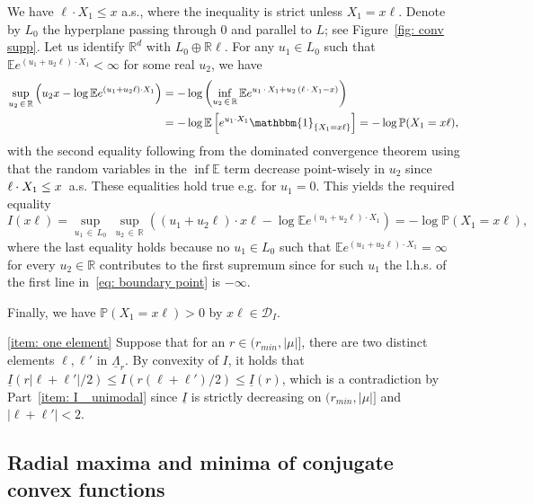 \documentclass[10pt]{amsart}
\theoremstyle{definition}\newtheorem{defi}[theo]{Definition}\newtheorem{rema}[theo]{Remark}\newtheorem{exam}[theo]{Example}\newtheorem{exem}[theo]{Example}\newtheorem{nota}[theo]{Notation}
\newcommand{\ubar}[1]{\underline{#1}}
\newcommand{\Rbb}{\mathbb{R}}
\newcommand{\E}{\mathbb{E}}
\newcommand{\Pbb}{\mathbb{P}}
\newcommand{\I}{\mathbbm{1}}
\newcommand{\Dcl}{\mathcal{D}}
\begin{document}
\begin{proofc}
\break
We have $\ell \cdot X_1 \le x$ a.s., where the inequality is strict unless $X_1=x\ell$. Denote by $L_0$ the hyperplane passing through $0$ and parallel to $L$; see Figure~\ref{fig: conv supp}. Let us identify $\Rbb^d$ with $L_0 \oplus \Rbb \ell$. For any $u_1 \in L_0$ such that $\E e^{(u_1 + u_2 \ell) \cdot X_1} < \infty$ for some real $u_2$, we have
\begin{equation}\label{eq: boundary point}
\begin{aligned}
\sup_{u_2\,\in\,\Rbb} \left(u_2 x - \log \E e^{\left(u_1 + u_2 \ell\right) \cdot X_1} \right) &= - \log \left(\inf_{u_2\,\in\, \Rbb} \E e^{u_1\,\cdot\,X_1 + u_2\,\left(\ell\,\cdot\,X_1 - x\right)} \right) \\
&=- \log \E\left[e^{u_1 \cdot X_1} \I_{\left\{X_1 = x \ell\right\}}\right] = - \log \Pbb(X_1 = x \ell),
\end{aligned}
\end{equation}
with the second equality following from the dominated convergence theorem using that the random variables in the $\inf \E$ term decrease point-wisely in $u_2 $ since $\ell \cdot X_1\linebreak\le x$~a.s. These equalities hold true e.g. for $u_1=0$. This yields the required equality
\[
I(x \ell) = \sup_{u_1\,\in\,L_0} \,\sup_{u_2\,\in\,\Rbb} \left (\left(u_1 + u_2\ell\right) \cdot x \ell - \log \E e^{\left(u_1 + u_2 \ell\right) \cdot X_1} \right) = - \log \Pbb\left(X_1 = x \ell\right),
\]
where the last equality holds because no $u_1 \in L_0$ such that $\E e^{(u_1 + u_2 \ell) \cdot X_1} = \infty$ for every $u_2 \in \Rbb$ contributes to the first supremum since for such $u_1$ the l.h.s. of the first line in~\eqref{eq: boundary point} is $-\infty$.

Finally, we have $\Pbb(X_1 = x \ell)>0$ by $x \ell \in \Dcl_I$.

\eqref{item: one element} Suppose that for an $r \in (r_{min}, |\mu|]$, there are two distinct elements $\ell, \ell'$ in $\ubar{\Lambda}_r$. By convexity of $I$, it holds that $\ubar I(r|\ell + \ell'|/2) \le I(r(\ell + \ell')/2) \le \ubar I(r)$, which is a contradiction by Part~\eqref{item: I_ unimodal} since $\ubar I$ is strictly decreasing on $(r_{min}, |\mu|]$ and\linebreak$|\ell + \ell'|<2$.
\end{proofc}

\subsection{Radial maxima and minima of conjugate convex functions} \label{Sec: radial proofs}
\end{document}
